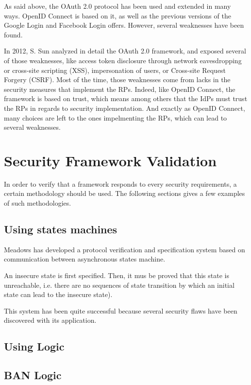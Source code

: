 As said above, the OAuth 2.0 protocol has been used and extended in many ways. OpenID Connect is based on it, as well as the previous versions of the Google Login and Facebook Login offers. However, several weaknesses have been found.

In 2012, S. Sun analyzed in detail the OAuth 2.0 framework, and exposed several of those weaknesses\cite{Sun2012}, like access token disclosure through network eavesdropping or cross-site scripting (XSS), impersonation of users, or Cross-site Request Forgery (CSRF). Most of the time, those weaknesses come from lacks in the security measures that implement the RPs. Indeed, like OpenID Connect, the framework is based on trust, which means among others that the IdPs must trust the RPs in regards to security implementation. And exactly as OpenID Connect, many choices are left to the ones impelmenting the RPs, which can lead to several weaknesses.


\section{Security Framework Validation}
In order to verify that a framework responds to every security requirements, a certain methodology should be used. The following sections gives a few examples of such methodologies.

\subsection{Using states machines}
Meadows \cite{TODO} has developed a protocol verification and specification system based on communication between asynchronous states machine. 

An insecure state is first specified. Then, it mus be proved that this state is unreachable, i.e. there are no sequences of state transition by which an initial state can lead to the insecure state).

This system has been quite successful because several security flaws have been discovered with its application.

\subsection{Using Logic}


\subsection{BAN Logic}

